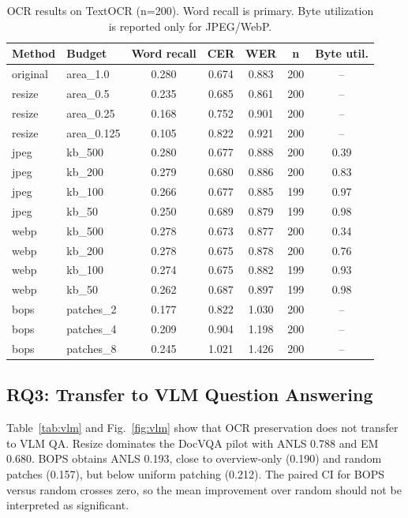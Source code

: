 \documentclass[conference]{IEEEtran}
\newcommand{\method}{BOPS}
\newcommand{\datasetocr}{TextOCR}
\begin{document}
\begin{table}[t]
\centering
\caption{OCR results on \datasetocr{} (n=200). Word recall is primary. Byte utilization is reported only for JPEG/WebP.}
\label{tab:ocr}
\begin{tabular}{llccccc}
\toprule
Method & Budget & Word recall & CER & WER & n & Byte util. \\
\midrule
original & area\_1.0 & 0.280 & 0.674 & 0.883 & 200 & -- \\
resize & area\_0.5 & 0.235 & 0.685 & 0.861 & 200 & -- \\
resize & area\_0.25 & 0.168 & 0.752 & 0.901 & 200 & -- \\
resize & area\_0.125 & 0.105 & 0.822 & 0.921 & 200 & -- \\
jpeg & kb\_500 & 0.280 & 0.677 & 0.888 & 200 & 0.39 \\
jpeg & kb\_200 & 0.279 & 0.680 & 0.886 & 200 & 0.83 \\
jpeg & kb\_100 & 0.266 & 0.677 & 0.885 & 199 & 0.97 \\
jpeg & kb\_50 & 0.250 & 0.689 & 0.879 & 199 & 0.98 \\
webp & kb\_500 & 0.278 & 0.673 & 0.877 & 200 & 0.34 \\
webp & kb\_200 & 0.278 & 0.675 & 0.878 & 200 & 0.76 \\
webp & kb\_100 & 0.274 & 0.675 & 0.882 & 199 & 0.93 \\
webp & kb\_50 & 0.262 & 0.687 & 0.897 & 199 & 0.98 \\
bops & patches\_2 & 0.177 & 0.822 & 1.030 & 200 & -- \\
bops & patches\_4 & 0.209 & 0.904 & 1.198 & 200 & -- \\
bops & patches\_8 & 0.245 & 1.021 & 1.426 & 200 & -- \\
\bottomrule
\end{tabular}
\end{table}

\subsection{RQ3: Transfer to VLM Question Answering}
Table~\ref{tab:vlm} and Fig.~\ref{fig:vlm} show that OCR preservation does not transfer to VLM QA. Resize dominates the DocVQA pilot with ANLS 0.788 and EM 0.680. \method{} obtains ANLS 0.193, close to overview-only (0.190) and random patches (0.157), but below uniform patching (0.212). The paired CI for \method{} versus random crosses zero, so the mean improvement over random should not be interpreted as significant.
\end{document}
